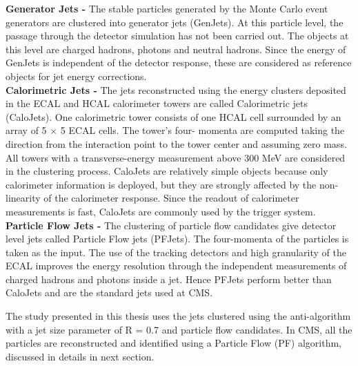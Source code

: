{\bf Generator Jets -} The stable particles generated by the Monte Carlo event generators are clustered into generator jets (GenJets). At this particle level, the passage through the detector simulation has not been carried out. The objects at this level are charged hadrons, photons and neutral hadrons. Since the energy of GenJets is independent of the detector response, these are considered as reference objects for jet energy corrections. \\ \newline
{\bf Calorimetric Jets -} The jets reconstructed using the energy clusters deposited in the ECAL and HCAL calorimeter towers are called Calorimetric jets (CaloJets). One calorimetric tower consists of one HCAL cell surrounded by an array of 5 $\times$ 5 ECAL cells. The tower’s four- momenta are computed taking the direction from the interaction point to the tower center and assuming zero mass. All towers with a transverse-energy measurement above 300 MeV are considered in the clustering process. CaloJets are relatively simple objects because only calorimeter information is deployed, but they are strongly affected by the non-linearity of the calorimeter response. Since the readout of calorimeter measurements is fast, CaloJets are commonly used by the trigger system. \\ \newline
{\bf Particle Flow Jets -} The clustering of particle flow candidates give detector level jets called Particle Flow jets (PFJets). The four-momenta of the particles is taken as the input. The use of the tracking detectors and high granularity of the ECAL improves the energy resolution through the independent measurements of charged hadrons and photons inside a jet. Hence PFJets perform better than CaloJets and are the standard jets used at CMS.

The study presented in this thesis uses the jets clustered using the anti-\kt algorithm with a jet size parameter of R = 0.7 and particle flow candidates. In CMS, all the particles are reconstructed and identified using a Particle Flow (PF) algorithm, discussed in details in next section.  

